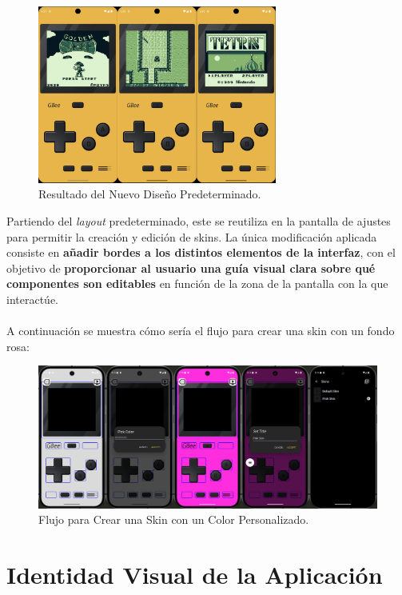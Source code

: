 \begin{figure}[H]
    \centering
    \includegraphics[width=0.7\textwidth]{include/images/default_skin.png}
    \caption{Resultado del Nuevo Diseño Predeterminado.}\label{figure:newDesignExamples}
\end{figure}

Partiendo del \textit{layout} predeterminado, este se reutiliza en la pantalla de ajustes para permitir la creación y edición de skins. La única modificación aplicada consiste en \textbf{añadir bordes a los distintos elementos de la interfaz}, con el objetivo de \textbf{proporcionar al usuario una guía visual clara sobre qué componentes son editables} en función de la zona de la pantalla con la que interactúe.
\\\\
A continuación se muestra cómo sería el flujo para crear una skin con un fondo rosa:

\begin{figure}[H]
    \centering
    \includegraphics[width=1\textwidth]{include/images/skin_pink.png}
    \caption{Flujo para Crear una Skin con un Color Personalizado.}\label{figure:skincustomcolor}
\end{figure}

\section{Identidad Visual de la Aplicación}

